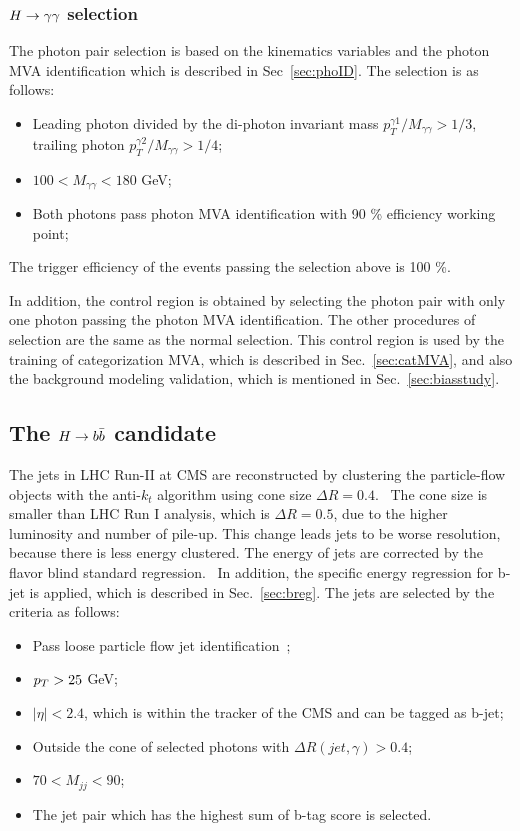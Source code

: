 \subsubsection{$H\to\gamma\gamma$ selection}\label{ssec:photonselection}

The photon pair selection is based on the kinematics variables and the photon MVA identification which is described in Sec~\ref{sec:phoID}.
The selection is as follows:
\begin{itemize}
\item Leading photon divided by the di-photon invariant mass $p^{\gamma 1}_{T}/M_{\gamma\gamma}>1/3$, trailing photon $p^{\gamma 2}_{T}/M_{\gamma\gamma}>1/4$;
\item $100 < M_{\gamma\gamma} < 180$ GeV;
\item Both photons pass photon MVA identification with 90 \% efficiency working point;
\end{itemize}
The trigger efficiency of the events passing the selection above is 100 \%.

In addition, the control region is obtained by selecting the photon pair with only one photon passing the photon MVA identification.
The other procedures of selection are the same as the normal selection.
This control region is used by the training of categorization MVA, which is described in Sec.~\ref{sec:catMVA}, and also the background modeling validation, which is mentioned in Sec.~\ref{sec:biasstudy}.

\subsection{The $H\to b\bar{b}$ candidate}

The jets in LHC Run-II at CMS are reconstructed by clustering the particle-flow objects with the anti-$k_{t}$ algorithm using cone size $\Delta R = 0.4$.~\cite{1126-6708-2008-04-063}
The cone size is smaller than LHC Run I analysis, which is $\Delta R = 0.5$, due to the higher luminosity and number of pile-up.
This change leads jets to be worse resolution, because there is less energy clustered.
The energy of jets are corrected by the flavor blind standard regression.~\cite{1107.4277} %
In addition, the specific energy regression for b-jet is applied, which is described in Sec.~\ref{sec:breg}.
The jets are selected by the criteria as follows:
\begin{itemize}
\item Pass loose particle flow jet identification~\cite{CMS-PAS-JME-16-003};
\item $p_{T}>25$ GeV;
\item $|\eta|<2.4$, which is within the tracker of the CMS and can be tagged as b-jet;
\item Outside the cone of selected photons with $ \Delta R(jet,\gamma) > 0.4$;
\item $70 < M_{jj} <90$;
\item The jet pair which has the highest sum of b-tag score is selected.
\end{itemize}


